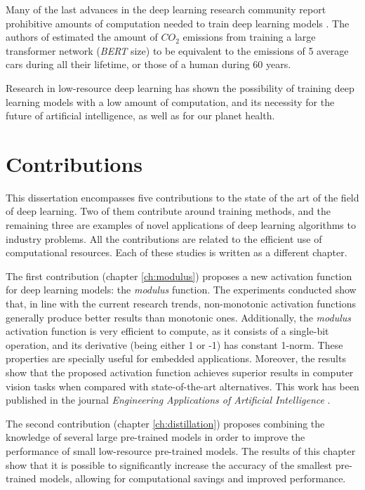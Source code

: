 Many of the last advances in the deep learning research community report prohibitive amounts of computation needed to train deep learning models \autocite{silver2016, kechyn2018, brown2020, floridi2020}. The authors of \autocite{strubell2019} estimated the amount of $CO_2$ emissions from training a large transformer network (\textit{BERT} size) to be equivalent to the emissions of 5 average cars during all their lifetime, or those of a human during 60 years. 

Research in low-resource deep learning \autocite{howard2017, Han2017, Gao2018, sanchez2020, so2021} has shown the possibility of training deep learning models with a low amount of computation, and its necessity for the future of artificial intelligence, as well as for our planet health.


\section{Contributions}
This dissertation encompasses five contributions to the state of the art of the field of deep learning. Two of them contribute around training methods, and the remaining three are examples of novel applications of deep learning algorithms to industry problems. All the contributions are related to the efficient use of computational resources. Each of these studies is written as a different chapter.

The first contribution (chapter \ref{ch:modulus}) proposes a new activation function for deep learning models: the \textit{modulus} function. The experiments conducted show that, in line with the current research trends, non-monotonic activation functions generally produce better results than monotonic ones. Additionally, the \textit{modulus} activation function is very efficient to compute, as it consists of a single-bit operation, and its derivative (being either 1 or -1) has constant 1-norm. These properties are specially useful for embedded applications. Moreover, the results show that the proposed activation function achieves superior results in computer vision tasks when compared with state-of-the-art alternatives. This work has been published in the journal \textit{Engineering Applications of Artificial Intelligence} \autocite{valles2023a}.

The second contribution (chapter \ref{ch:distillation}) proposes combining the knowledge of several large pre-trained models in order to improve the performance of small low-resource pre-trained models. The results of this chapter show that it is possible to significantly increase the accuracy of the smallest pre-trained models, allowing for computational savings and improved performance.

